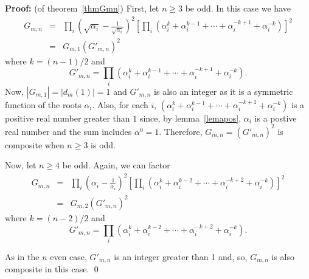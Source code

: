 \documentclass{amsart}
\begin{document}
{\noindent \textbf{Proof: }} (of theorem~\ref{thmGmn}) 
First, let $n \geq 3$ be odd. In this case we have
\begin{eqnarray*}
G_{m,n} & = & \prod_i (\sqrt{\alpha_i} - \frac{1}{\sqrt{\alpha_i}})^2 \left[
\prod_i (\alpha_i^k + \alpha_i^{k-1} + \cdots + \alpha_i^{-k+1} + \alpha_i^{-k}) \right]^2 \\
& = & G_{m,1} (G'_{m,n})^2
\end{eqnarray*}
where $k = (n-1)/2$ and 
$$G'_{m,n} = \prod_i (\alpha_i^k + \alpha_i^{k-1} + \cdots + \alpha_i^{-k+1} + \alpha_i^{-k}).$$
Now, $|G_{m,1}| = |d_m(1)| = 1$ and $G'_{m,n}$ is also an integer as it
is a symmetric function of the roots $\alpha_i$. 
Also, for each $i$, $(\alpha_i^k + \alpha_i^{k-1} + \cdots + \alpha_i^{-k+1} + \alpha_i^{-k})$ is a positive real number greater than $1$ since, by lemma~\ref{lemapos},
$\alpha_i$ is a postive real number
and the sum includes $\alpha^0 = 1$. Therefore, 
$G_{m,n} = (G'_{m,n})^2$ is composite when $n \geq 3$ is odd.

Now, let $n \geq 4$ be odd. Again, we can factor
\begin{eqnarray*}
G_{m,n} & = & \prod_i ({\alpha_i} - \frac{1}{\alpha_i})^2 \left[
\prod_i (\alpha_i^k + \alpha_i^{k-2} + \cdots + \alpha_i^{-k+2} + \alpha_i^{-k}) \right]^2 \\
& = & G_{m,2} (G'_{m,n})^2
\end{eqnarray*}
where $k = (n-2)/2$ and 
$$G'_{m,n} = \prod_i (\alpha_i^k + \alpha_i^{k-2} + \cdots + \alpha_i^{-k+2} + \alpha_i^{-k}).$$

As in the $n$ even case, $G'_{m,n}$ is an integer greater than 1 and, so,
$G_{m,n}$ is also composite in this case.
{\qed}
\end{document}
